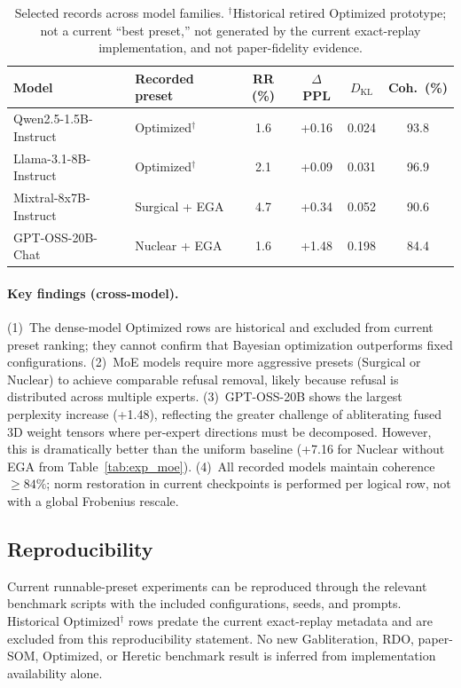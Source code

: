 \documentclass[11pt]{article}
\begin{document}
\begin{table}[h]
\centering
\caption{Selected records across model families. $^\dagger$Historical retired Optimized prototype; not a current ``best preset,'' not generated by the current exact-replay implementation, and not paper-fidelity evidence.}
\label{tab:exp_cross}
\small
\begin{tabular}{@{}llcccc@{}}
\toprule
\textbf{Model} & \textbf{Recorded preset} & \textbf{RR (\%)} & \textbf{$\Delta$PPL} & \textbf{$D_{\text{KL}}$} & \textbf{Coh.\ (\%)} \\
\midrule
Qwen2.5-1.5B-Instruct & Optimized$^\dagger$ & 1.6 & +0.16 & 0.024 & 93.8 \\
Llama-3.1-8B-Instruct & Optimized$^\dagger$ & 2.1 & +0.09 & 0.031 & 96.9 \\
Mixtral-8x7B-Instruct & Surgical + EGA & 4.7 & +0.34 & 0.052 & 90.6 \\
GPT-OSS-20B-Chat & Nuclear + EGA & 1.6 & +1.48 & 0.198 & 84.4 \\
\bottomrule
\end{tabular}
\end{table}

\paragraph{Key findings (cross-model).}
(1)~The dense-model Optimized rows are historical and excluded from current preset ranking; they cannot confirm that Bayesian optimization outperforms fixed configurations.
(2)~MoE models require more aggressive presets (Surgical or Nuclear) to achieve comparable refusal removal, likely because refusal is distributed across multiple experts.
(3)~GPT-OSS-20B shows the largest perplexity increase (+1.48), reflecting the greater challenge of abliterating fused 3D weight tensors where per-expert directions must be decomposed. However, this is dramatically better than the uniform baseline (+7.16 for Nuclear without EGA from Table~\ref{tab:exp_moe}).
(4)~All recorded models maintain coherence $\geq 84\%$; norm restoration in current checkpoints is performed per logical row, not with a global Frobenius rescale.

\subsection{Reproducibility}

Current runnable-preset experiments can be reproduced through the relevant benchmark scripts with the included configurations, seeds, and prompts. Historical Optimized$^\dagger$ rows predate the current exact-replay metadata and are excluded from this reproducibility statement. No new Gabliteration, RDO, paper-SOM, Optimized, or Heretic benchmark result is inferred from implementation availability alone.
\end{document}
